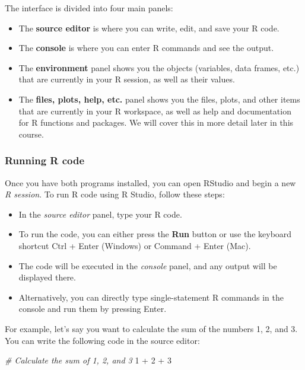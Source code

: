 \documentclass[
]{book}
\newenvironment{Shaded}{\begin{snugshade}}{\end{snugshade}}
\newcommand{\CommentTok}[1]{\textcolor[rgb]{0.56,0.35,0.01}{\textit{#1}}}
\newcommand{\DecValTok}[1]{\textcolor[rgb]{0.00,0.00,0.81}{#1}}
\newcommand{\SpecialCharTok}[1]{\textcolor[rgb]{0.00,0.00,0.00}{#1}}
\providecommand{\tightlist}{%
  \setlength{\itemsep}{0pt}\setlength{\parskip}{0pt}}
\begin{document}
The interface is divided into four main panels:

\begin{itemize}
\tightlist
\item
  The \textbf{source editor} is where you can write, edit, and save your R code.
\item
  The \textbf{console} is where you can enter R commands and see the output.
\item
  The \textbf{environment} panel shows you the objects (variables, data frames, etc.) that are currently in your R session, as well as their values.
\item
  The \textbf{files, plots, help, etc.} panel shows you the files, plots, and other items that are currently in your R workspace, as well as help and documentation for R functions and packages. We will cover this in more detail later in this course.
\end{itemize}

\hypertarget{running-r-code}{%
\subsubsection{Running R code}\label{running-r-code}}

Once you have both programs installed, you can open RStudio and begin a new \emph{R session}. To run R code using R Studio, follow these steps:

\begin{itemize}
\tightlist
\item
  In the \emph{source editor} panel, type your R code.
\item
  To run the code, you can either press the \textbf{Run} button or use the keyboard shortcut Ctrl + Enter (Windows) or Command + Enter (Mac).
\item
  The code will be executed in the \emph{console} panel, and any output will be displayed there.
\item
  Alternatively, you can directly type single-statement R commands in the console and run them by pressing Enter.
\end{itemize}

For example, let's say you want to calculate the sum of the numbers 1, 2, and 3. You can write the following code in the source editor:

\begin{Shaded}
\begin{Highlighting}[]
\CommentTok{\# Calculate the sum of 1, 2, and 3}
\DecValTok{1} \SpecialCharTok{+} \DecValTok{2} \SpecialCharTok{+} \DecValTok{3}
\end{Highlighting}
\end{Shaded}
\end{document}
